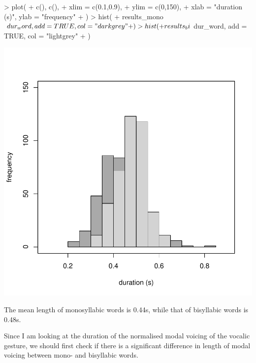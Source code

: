 \documentclass{article}
\begin{document}
\begin{Schunk}
\begin{Sinput}
> plot(
+     c(), c(),
+     xlim = c(0.1,0.9),
+     ylim = c(0,150),
+     xlab = "duration (s)", ylab = "frequency"
+ )
> hist(
+     results_mono$dur_word, add = TRUE, col = "darkgrey"
+ )
> hist(
+     results_bi$dur_word, add = TRUE, col = "lightgrey"
+ )
\end{Sinput}
\end{Schunk}
\includegraphics{analysis-004}

The mean length of monosyllabic words is 0.44s, while that of bisyllabic words is 0.48s.

Since I am looking at the duration of the normalised modal voicing of the vocalic gesture, we should first check if there is a significant difference in length of modal voicing between mono- and bisyllabic words.

\begin{Schunk}
\end{Schunk}
\end{document}
